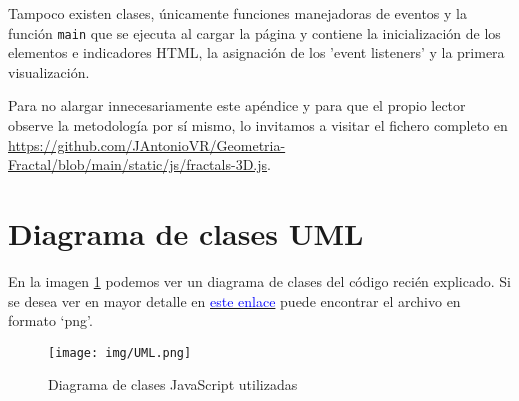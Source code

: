 Tampoco existen clases, únicamente funciones manejadoras de eventos y la función \verb|main| que se ejecuta al cargar la página y contiene la inicialización de los elementos e indicadores HTML, la asignación de los 'event listeners' y la primera visualización.

Para no alargar innecesariamente este apéndice y para que el propio lector observe la metodología por sí mismo, lo invitamos a visitar el fichero completo en \url{https://github.com/JAntonioVR/Geometria-Fractal/blob/main/static/js/fractals-3D.js}.

\newpage

\section{Diagrama de clases UML}
\label{section:UML}

En la imagen \ref{fig:UML} podemos ver un diagrama de clases del código recién explicado. Si se desea ver en mayor detalle en \href{https://github.com/JAntonioVR/Geometria-Fractal/blob/main/memoria/img/UML.png}{\textcolor{blue}{este enlace}} puede encontrar el archivo en formato `png'.

\begin{figure} [ht]
\centering
\texttt{[image: img/UML.png]}
\caption{Diagrama de clases JavaScript utilizadas}
    \label{fig:UML}
\end{figure}